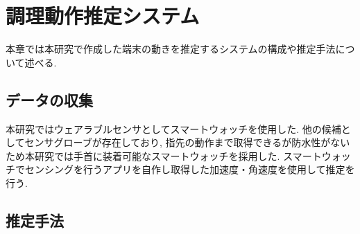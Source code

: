 \section{調理動作推定システム}
本章では本研究で作成した端末の動きを推定するシステムの構成や推定手法について述べる.
\subsection{データの収集}
本研究ではウェアラブルセンサとしてスマートウォッチを使用した.
他の候補としてセンサグローブが存在しており,
指先の動作まで取得できるが防水性がないため本研究では手首に装着可能なスマートウォッチを採用した.
スマートウォッチでセンシングを行うアプリを自作し取得した加速度・角速度を使用して推定を行う.
\subsection{推定手法}
